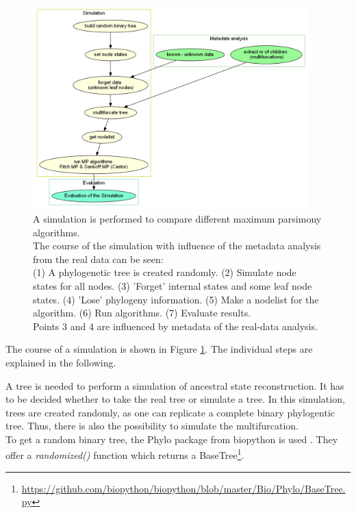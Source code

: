     \begin{figure}[h!]
      \centering
      \includegraphics[width=0.95\textwidth]{Figures/Workflow-Simulation.png}
      \caption{A simulation is performed to compare different maximum parsimony algorithms. \\
        The course of the simulation with influence of the metadata analysis from the real data can
          be seen: \\
        (1) A phylogenetic tree is created randomly. (2) Simulate node states for all nodes. (3) 
          'Forget' internal states and some leaf node states. (4) 'Lose' phylogeny information. (5) 
          Make a nodelist for the algorithm. (6) Run algorithms. (7) Evaluate results. \\
        Points 3 and 4 are influenced by metadata of the real-data analysis.}
      \label{fig:Simulation Workflow}
    \end{figure}
    The course of a simulation is shown in Figure \ref{fig:Simulation Workflow}. The individual steps 
      are explained in the following.

    A tree is needed to perform a simulation of ancestral state reconstruction. It has to be decided 
      whether to take the real tree or simulate a tree. In this simulation, trees are created randomly, 
      as one can replicate a complete binary phylogentic tree. Thus, there is also the possibility to 
      simulate the multifurcation. \\
    To get a random binary tree, the Phylo package from biopython is used \cite{Cock2009}. They offer 
      a \textit{randomized()} function which returns a BaseTree\footnote{
        \hyperlink{https://github.com/biopython/biopython/blob/master/Bio/Phylo/BaseTree.py}
        {https://github.com/biopython/biopython/blob/master/Bio/Phylo/BaseTree.py}
      }.

